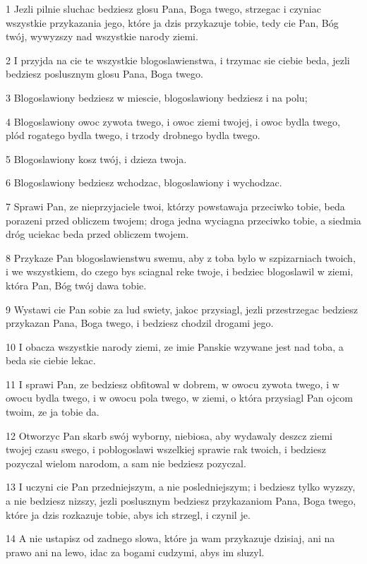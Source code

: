 \par 1 Jezli pilnie sluchac bedziesz glosu Pana, Boga twego, strzegac i czyniac wszystkie przykazania jego, które ja dzis przykazuje tobie, tedy cie Pan, Bóg twój, wywyzszy nad wszystkie narody ziemi.
\par 2 I przyjda na cie te wszystkie blogoslawienstwa, i trzymac sie ciebie beda, jezli bedziesz poslusznym glosu Pana, Boga twego.
\par 3 Blogoslawiony bedziesz w miescie, blogoslawiony bedziesz i na polu;
\par 4 Blogoslawiony owoc zywota twego, i owoc ziemi twojej, i owoc bydla twego, plód rogatego bydla twego, i trzody drobnego bydla twego.
\par 5 Blogoslawiony kosz twój, i dzieza twoja.
\par 6 Blogoslawiony bedziesz wchodzac, blogoslawiony i wychodzac.
\par 7 Sprawi Pan, ze nieprzyjaciele twoi, którzy powstawaja przeciwko tobie, beda porazeni przed obliczem twojem; droga jedna wyciagna przeciwko tobie, a siedmia dróg uciekac beda przed obliczem twojem.
\par 8 Przykaze Pan blogoslawienstwu swemu, aby z toba bylo w szpizarniach twoich, i we wszystkiem, do czego bys sciagnal reke twoje, i bedziec blogoslawil w ziemi, która Pan, Bóg twój dawa tobie.
\par 9 Wystawi cie Pan sobie za lud swiety, jakoc przysiagl, jezli przestrzegac bedziesz przykazan Pana, Boga twego, i bedziesz chodzil drogami jego.
\par 10 I obacza wszystkie narody ziemi, ze imie Panskie wzywane jest nad toba, a beda sie ciebie lekac.
\par 11 I sprawi Pan, ze bedziesz obfitowal w dobrem, w owocu zywota twego, i w owocu bydla twego, i w owocu pola twego, w ziemi, o która przysiagl Pan ojcom twoim, ze ja tobie da.
\par 12 Otworzyc Pan skarb swój wyborny, niebiosa, aby wydawaly deszcz ziemi twojej czasu swego, i poblogoslawi wszelkiej sprawie rak twoich, i bedziesz pozyczal wielom narodom, a sam nie bedziesz pozyczal.
\par 13 I uczyni cie Pan przedniejszym, a nie posledniejszym; i bedziesz tylko wyzszy, a nie bedziesz nizszy, jezli poslusznym bedziesz przykazaniom Pana, Boga twego, które ja dzis rozkazuje tobie, abys ich strzegl, i czynil je.
\par 14 A nie ustapisz od zadnego slowa, które ja wam przykazuje dzisiaj, ani na prawo ani na lewo, idac za bogami cudzymi, abys im sluzyl.
